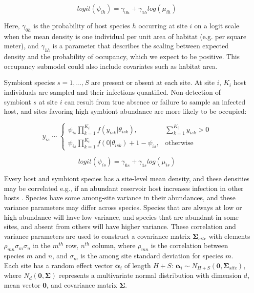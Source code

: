 \begin{equation*}
logit(\psi_{ih}) = \gamma_{0h} + \gamma_{1h} log(\mu_{ih})
\tag{eqn 2}
\end{equation*}

Here, $\gamma_{0h}$ is the probability of host species $h$ occurring at site $i$ on a logit scale when the mean density is one individual per unit area of habitat (e.g. per square meter), and $\gamma_{1h}$ is a parameter that describes the scaling between expected density and the probability of occupancy, which we expect to be positive.
This occupancy submodel could also include covariates such as habitat area.

Symbiont species $s=1, ..., S$ are present or absent at each site.
At site $i$, $K_i$ host individuals are sampled and their infections quantified.
Non-detection of symbiont $s$ at site $i$ can result from true absence or failure to sample an infected host, and sites favoring high symbiont abundance are more likely to be occupied:

\begin{equation*}
y_{is} \sim \begin{cases}
  \psi_{is} \prod \limits_{k=1}^{K_i} f(y_{isk}|\theta_{isk}), & \sum \limits_{k=1}^{K_i} y_{isk} > 0 \\
  \psi_{is} \prod \limits_{k=1}^{K_i} f(0|\theta_{isk}) + 1 - \psi_{is}, &\text{otherwise}
  \end{cases}
\tag{eqn 3}
\end{equation*}

\begin{equation*}
logit(\psi_{is}) = \gamma_{0s} + \gamma_{1s} log(\mu_{is})
\tag{eqn 4}
\end{equation*}

Every host and symbiont species has a site-level mean density, and these densities may be correlated e.g., if an abundant reservoir host increases infection in other hosts \citep{Ashford2003}.
Species have some among-site variance in their abundances, and these variance parameters may differ across species.
Species that are always at low or high abundance will have low variance, and species that are abundant in some sites, and absent from others will have higher variance.
These correlation and variance parameters are used to construct a covariance matrix $\boldsymbol{\Sigma}_{site}$ with elements $\rho_{mn} \sigma_m \sigma_n$ in the $m^{th}$ row, $n^{th}$ column, where $\rho_{mn}$ is the correlation between species $m$ and $n$, and $\sigma_m$ is the among site standard deviation for species $m$.
Each site has a random effect vector $\boldsymbol{\alpha}_i$ of length $H+S$: $\boldsymbol{\alpha}_i \sim N_{H+S}(\boldsymbol{0}, \boldsymbol{\Sigma}_{site})$, where $N_{d}(\boldsymbol{0}, \boldsymbol{\Sigma})$ represents a multivariate normal distribution with dimension $d$, mean vector $\boldsymbol{0}$, and covariance matrix $\boldsymbol{\Sigma}$.

